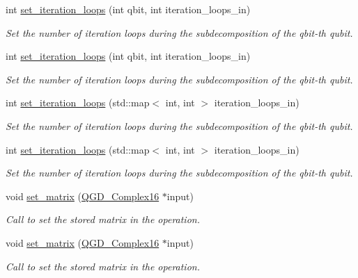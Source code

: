 \begin{DoxyCompactItemize}
int \hyperlink{class_decomposition___base_aaf2862ee2211dac36242551340190b4b}{set\+\_\+iteration\+\_\+loops} (int qbit, int iteration\+\_\+loops\+\_\+in)
\begin{DoxyCompactList}\small\item\em Set the number of iteration loops during the subdecomposition of the qbit-\/th qubit. \end{DoxyCompactList}\item 
int \hyperlink{class_decomposition___base_aaf2862ee2211dac36242551340190b4b}{set\+\_\+iteration\+\_\+loops} (int qbit, int iteration\+\_\+loops\+\_\+in)
\begin{DoxyCompactList}\small\item\em Set the number of iteration loops during the subdecomposition of the qbit-\/th qubit. \end{DoxyCompactList}\item 
int \hyperlink{class_decomposition___base_aa376f8cfdb1b9ed06bceff9c72ddf496}{set\+\_\+iteration\+\_\+loops} (std\+::map$<$ int, int $>$ iteration\+\_\+loops\+\_\+in)
\begin{DoxyCompactList}\small\item\em Set the number of iteration loops during the subdecomposition of the qbit-\/th qubit. \end{DoxyCompactList}\item 
int \hyperlink{class_decomposition___base_aa376f8cfdb1b9ed06bceff9c72ddf496}{set\+\_\+iteration\+\_\+loops} (std\+::map$<$ int, int $>$ iteration\+\_\+loops\+\_\+in)
\begin{DoxyCompactList}\small\item\em Set the number of iteration loops during the subdecomposition of the qbit-\/th qubit. \end{DoxyCompactList}\item 
void \hyperlink{class_operation_a026d3dcf0ad00af99c7a9097d3cf1c74}{set\+\_\+matrix} (\hyperlink{struct_q_g_d___complex16}{Q\+G\+D\+\_\+\+Complex16} $\ast$input)
\begin{DoxyCompactList}\small\item\em Call to set the stored matrix in the operation. \end{DoxyCompactList}\item 
void \hyperlink{class_operation_a026d3dcf0ad00af99c7a9097d3cf1c74}{set\+\_\+matrix} (\hyperlink{struct_q_g_d___complex16}{Q\+G\+D\+\_\+\+Complex16} $\ast$input)
\begin{DoxyCompactList}\small\item\em Call to set the stored matrix in the operation. \end{DoxyCompactList}\item 

\end{DoxyCompactItemize}
